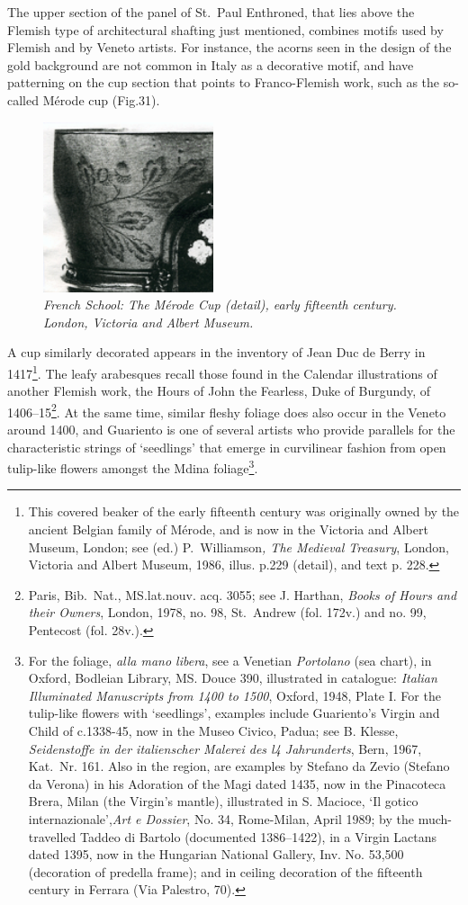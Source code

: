 \documentclass[a4paper,12pt]{article}
\begin{document}
The upper section of the panel of St.~Paul Enthroned, that lies above
the Flemish type of architectural shafting just mentioned, combines
motifs used by Flemish and by Veneto artists. For instance, the acorns
seen in the design of the gold background are not common in Italy as a
decorative motif, and have patterning on the cup section that points
to Franco-Flemish work, such as the so-called M\'erode cup (Fig.31). 
\begin{figure}[htbp]
\centering
\includegraphics[width=5cm]{pics/fig31.png}
\caption[French School: The M\'erode Cup (detail)] 
{\it French School: The M\'erode Cup (detail), early fifteenth century.
London, Victoria and Albert Museum.}
\end{figure}
A
cup similarly decorated appears in the inventory of Jean Duc de Berry
in 1417\footnote{This covered beaker of the early fifteenth century
was originally owned by the ancient Belgian family of M\'erode, and is
now in the Victoria and Albert Museum, London; see (ed.)
P.~Williamson\textit{, The Medieval Treasury}, London, Victoria and
Albert Museum, 1986, illus. p.229 (detail), and text p. 228.}. The
leafy arabesques recall those found in the Calendar illustrations of
another Flemish work, the Hours of John the Fearless, Duke of
Burgundy, of 1406--15\footnote{Paris, Bib.~Nat., MS.lat.nouv. acq. 3055;
see J. Harthan, \textit{Books of Hours and their Owners}, London,
1978, no. 98, St.~Andrew (fol. 172v.) and no. 99, Pentecost
(fol. 28v.).}. At the same time, similar fleshy foliage does also
occur in the Veneto around 1400, and Guariento is one of several
artists who provide parallels for the characteristic strings of
`seedlings' that emerge in curvilinear fashion from open tulip-like
flowers amongst the Mdina foliage\footnote{For the foliage,
\textit{alla mano libera}, see a Venetian \textit{Portolano} (sea
chart), in Oxford, Bodleian Library, MS. Douce 390, illustrated in
catalogue: \textit{Italian Illuminated Manuscripts from 1400 to 1500},
Oxford, 1948, Plate I.  For the tulip-like flowers with `seedlings',
examples include Guariento's Virgin and Child of c.1338-45, now in the
Museo Civico, Padua; see B. Klesse, \textit{Seidenstoffe in der
italienscher Malerei des l4 Jahrunderts}, Bern, 1967,
Kat.~Nr. 161. Also in the region, are examples by Stefano da Zevio
(Stefano da Verona) in his Adoration of the Magi dated 1435, now in
the Pinacoteca Brera, Milan (the Virgin's mantle), illustrated in
S. Macioce, `Il gotico internazionale',\textit{Art e Dossier}, No. 34,
Rome-Milan, April 1989; by the much-travelled Taddeo di Bartolo
(documented 1386--1422), in a Virgin Lactans dated 1395, now in the
Hungarian National Gallery, Inv. No. 53,500 (decoration of predella
frame); and in ceiling decoration of the fifteenth century in Ferrara
(Via Palestro, 70).}.
\end{document}
